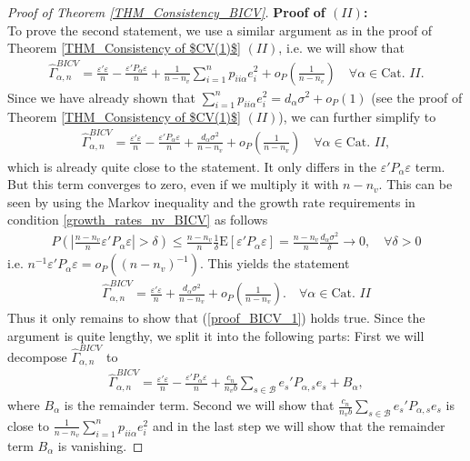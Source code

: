 \documentclass[Research_Module_ES.tex]{subfiles}
\begin{document}
\begin{proof}[Proof of Theorem \ref{THM_Consistency_BICV}]
	\textbf{Proof of $(II)$:} \\
	To prove the second statement, we use a similar argument as in the proof of Theorem \ref{THM_Consistency of $CV(1)$} $(II)$, i.e. we will show that
	\begin{align}
	\hat{\Gamma}_{\alpha,n}^{BICV} = \frac{\varepsilon'\varepsilon}{n}-\frac{\varepsilon'P_\alpha\varepsilon}{n}+\frac{1}{n-n_v}\sum_{i=1}^np_{ii\alpha}e_i^2+o_P\left(\frac{1}{n-n_v}\right) \quad \forall \alpha\in \textrm{Cat. $II$}. \label{proof_BICV_1}
	\end{align}
	Since we have already shown that $\sum_{i=1}^np_{ii\alpha}e_i^2=d_\alpha\sigma^2 +o_P(1)$ (see the proof of Theorem \ref{THM_Consistency of $CV(1)$} $(II)$), we can further simplify to
	\begin{align*}
	\hat{\Gamma}_{\alpha,n}^{BICV} = \frac{\varepsilon'\varepsilon}{n}-\frac{\varepsilon'P_\alpha\varepsilon}{n}+\frac{d_\alpha\sigma^2}{n-n_v}+o_P\left(\frac{1}{n-n_v}\right) \quad \forall \alpha\in \textrm{Cat. $II$},
	\end{align*}
	which is already quite close to the statement. It only differs in the $\varepsilon'P_\alpha\varepsilon$ term. But this term converges to zero, even if we multiply it with $n-n_v$. This can be seen by using the Markov inequality and the growth rate requirements in condition \ref{growth_rates_nv_BICV} as follows
	\begin{align*}
	P\left(\left\lvert \frac{n-n_v}{n}\varepsilon'P_\alpha\varepsilon\right\rvert > \delta\right)\le \frac{n-n_v}{n}\frac{1}{\delta}\mathrm{E}[\varepsilon'P_\alpha\varepsilon]=\frac{n-n_v}{n}\frac{d_\alpha\sigma^2}{\delta}\to 0,\quad\forall \delta >0
	\end{align*}
	i.e. $n^{-1}\varepsilon'P_\alpha\varepsilon=o_P((n-n_v)^{-1})$. This yields the statement
	\begin{align*}
	\hat{\Gamma}_{\alpha,n}^{BICV} = \frac{\varepsilon'\varepsilon}{n}+\frac{d_\alpha\sigma^2}{n-n_v}+o_P\left(\frac{1}{n-n_v}\right). \quad \forall \alpha\in \textrm{Cat. $II$}
	\end{align*}
	Thus it only remains to show that (\ref{proof_BICV_1}) holds true. Since the argument is quite lengthy, we split it into the following parts: 	
	First we will decompose $\hat{\Gamma}_{\alpha,n}^{BICV}$ to 
	\begin{align*}
	\hat{\Gamma}_{\alpha,n}^{BICV} = \frac{\varepsilon'\varepsilon}{n}-\frac{\varepsilon'P_\alpha\varepsilon}{n}+\frac{c_n}{n_v b}\sum_{s\in \mathcal{B}}e_s'P_{\alpha,s}e_s+B_\alpha,
	\end{align*}
	where $B_\alpha$ is the remainder term.
	Second we will show that $\frac{c_n}{n_v b}\sum_{s\in \mathcal{B}}e_s'P_{\alpha,s}e_s$ is close to $\frac{1}{n-n_v}\sum_{i=1}^np_{ii\alpha}e_i^2$ and in the last step we will show that the remainder term $B_\alpha$ is vanishing.
	

\end{proof}
\end{document}
